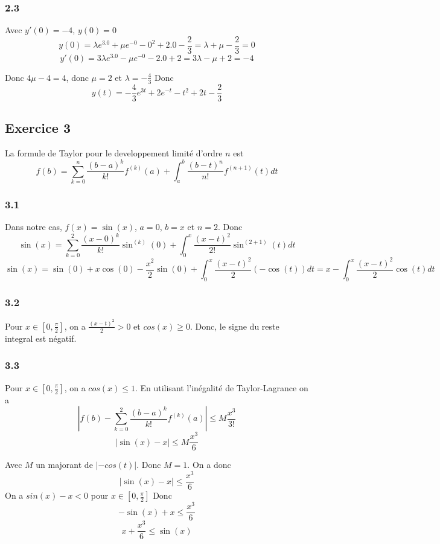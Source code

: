 \documentclass[]{book}
\theoremstyle{definition}
\begin{document}
\subsubsection*{2.3}
Avec $y'(0) = -4$, $y(0) = 0$
$$y(0) = \lambda e^{3.0} + \mu e^{-0} -0^2 + 2.0 -\frac{2}{3} = \lambda + \mu - \frac{2}{3} = 0$$
$$y'(0) = 3\lambda e^{3.0} - \mu e^{-0} -2.0 + 2 = 3\lambda - \mu + 2 = -4$$

Donc $4\mu - 4 = 4$, donc $\mu = 2$ et $\lambda = -\frac{4}{3}$
Donc
$$y(t) = -\frac{4}{3}e^{3t} + 2 e^{-t} -t^2 + 2t -\frac{2}{3}$$



\subsection*{Exercice 3}
La formule de Taylor pour le developpement limit\'e d'ordre $n$ est
$$f(b) = \sum_{k=0}^n{\frac{(b-a)^k}{k!}f^{(k)}(a)} + \int_a^b{\frac{(b-t)^n}{n!}f^{(n+1)}(t)dt}$$

\subsubsection*{3.1}
Dans notre cas, $f(x) = \sin(x)$, $a = 0$, $b = x$ et $n = 2$.
Donc 
$$\sin(x) = \sum_{k=0}^2{\frac{(x-0)^k}{k!}\sin^{(k)}(0)} + \int_0^x{\frac{(x-t)^2}{2!}\sin^{(2+1)}(t)dt}$$
$$\sin(x) = \sin(0) + x\cos(0) - \frac{x^2}{2}\sin(0) + \int_0^x{\frac{(x-t)^2}{2}(-\cos(t))dt} = x - \int_0^x{\frac{(x-t)^2}{2}\cos(t)dt}$$

\subsubsection*{3.2}
Pour $x \in [0,\frac{\pi}{2}]$, on a $\frac{(x-t)^2}{2} >0$ et $cos(x) \geq 0$. Donc, le signe du reste integral est n\'egatif.

\subsubsection*{3.3}
Pour $x \in [0,\frac{\pi}{2}]$, on a $cos(x) \leq 1$.
En utilisant l'in\'egalit\'e de Taylor-Lagrance on a 
$$|f(b) - \sum_{k=0}^2{\frac{(b-a)^k}{k!}f^{(k)}(a)}| \leq M\frac{x^3}{3!}$$
$$|\sin(x) - x| \leq M\frac{x^3}{6}$$

Avec $M$ un majorant de $|-cos(t)|$. Donc $M=1$.
On a donc 
$$|\sin(x) - x| \leq \frac{x^3}{6}$$
On a $sin(x) - x < 0$ pour $x \in [0,\frac{\pi}{2}]$ Donc
$$-\sin(x) + x \leq \frac{x^3}{6}$$
$$x+\frac{x^3}{6} \leq \sin(x)$$
\end{document}
